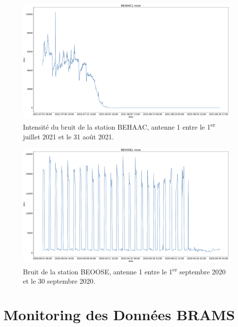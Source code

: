 \documentclass[11pt]{article}
\begin{document}
\begin{figure}[t]
    \begin{center}
        \includegraphics[scale=0.17]{BEHAAC1_2021-07-01_2021-08-31_noise.png}
        \caption{Intensité du bruit de la station BEHAAC, antenne 1 entre le 1\textsuperscript{er} juillet 2021 et le 31 août 2021.}
        \label{fig:BEHAAC-anomalie}
    \end{center}
\end{figure}

\begin{figure}[t]
    \begin{center}
        \includegraphics[scale=0.17]{BEOOSE1_2020-09-01_2020-09-30_noise.png}
        \caption{Bruit de la station BEOOSE, antenne 1 entre le 1\textsuperscript{er} septembre 2020 et le 30 septembre 2020.}
        \label{fig:BEOOSE-anomalie}
    \end{center}
\end{figure}

\section{Monitoring des Données BRAMS} \label{sec:monitoring}
\end{document}

